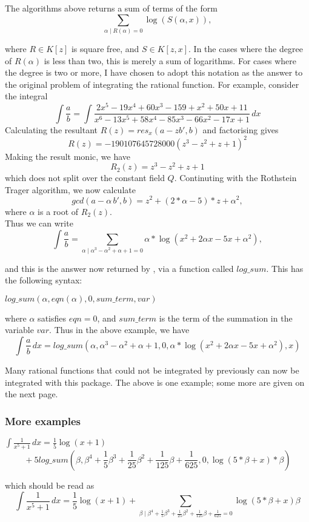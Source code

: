 \hypertarget{operator:LOG_SUM}{}
The algorithms above returns a sum of terms of the form
\[ \sum_{\alpha \mid R(\alpha)=0} \log(S(\alpha,x)), \]

where $R \in K[z]$ is square free, and $S \in K[z,x]$. In the cases where the degree of $R(\alpha)$ is less than two, this is merely a sum of logarithms. For cases where the degree is two or more, I have chosen to adopt this notation as the answer to the original problem of integrating the rational function. For example,
consider the integral
 \[ \int \frac{a}{b}=\int \frac{2x^5-19x^4+60x^3-159+x^2+50x+11}{x^6-13x^5+58x^4-85x^3-66x^2-17x+1}\, dx \]
Calculating the resultant $R(z)=res_x(a-zb',b)$ and factorising gives
  \[ R(z)=-190107645728000(z^3-z^2+z+1)^{2} \]
Making the result monic, we have
\[ R_2(z)=z^3-z^2+z+1 \]
which does not split over the constant field $Q$.
Continuting with the Rothstein Trager algorithm, we now calculate
\[ gcd(a-\alpha\,b',b)=z^2+(2*\alpha-5)*z+\alpha^2, \] where $\alpha$ is a root of $R_2(z)$. \\
Thus we can write
\[ \int \frac{a}{b}= \sum_{\alpha \mid \alpha^3-\alpha^2+\alpha+1=0} \alpha*\log(x^2+2\alpha x-5x+\alpha^2), \]

and this is the answer now returned by \REDUCE, via a function called $log\_sum$. This has the following syntax:
\begin{center}$ log\_sum(\alpha,eqn(\alpha),0,sum\_term,var)$ \end{center}
where $\alpha$ satisfies $eqn=0$, and $sum\_term$ is the term of the summation in the variable $var$. Thus in the above example, we have
\[ \int \frac{a}{b}\,dx= log\_sum(\alpha,\alpha^3-\alpha^2+\alpha+1,0,\alpha*\log(x^2+2\alpha x-5x+\alpha^2),x) \]

Many rational functions that could not be integrated by \REDUCE previously can now be integrated with this package. The above is one example; some more are given on the next page.

\subsubsection{More examples}
\(
\displaystyle \int \frac{1}{x^5+1} \, dx = \frac{1}{5}\log(x + 1)
\)
\[
\mbox{} + 5 log\_sum(\beta,\beta^4+\frac{1}{5}\beta^3+\frac{1}{25}\beta^2+\frac{1}{125}\beta+\frac{1}{625},0,\log(5*\beta+x)*\beta)
\]

which should be read as
\[
\int \frac{1}{x^5+1}\,dx = \frac{1}{5}\log(x+1)+\sum_{\beta \mid\beta^4+\frac{1}{5}\beta^3+\frac{1}{25}\beta^2+\frac{1}{125}\beta+\frac{1}{625}=0}\log(5*\beta+x)\beta
\]

